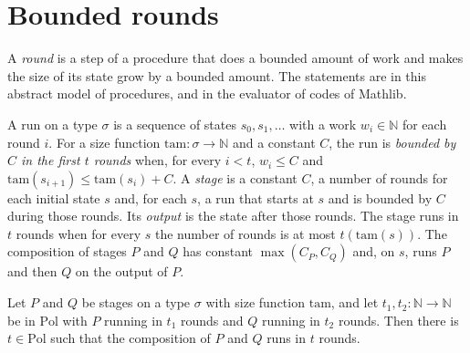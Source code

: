 \section{Bounded rounds}
\label{sec:machines-rounds}

A \emph{round} is a step of a procedure that does a bounded amount of work and makes the size of its state grow
by a bounded amount. The statements are in this abstract model of procedures, and in the evaluator of codes of
Mathlib.

\begin{definition}
  \label{def:machines-rounds}
  \leanok
  A run on a type $\sigma$ is a sequence of states $s_0, s_1, \dots$ with a work $w_i \in \mathbb{N}$ for each
  round $i$. For a size function $\mathrm{tam} : \sigma \to \mathbb{N}$ and a constant $C$, the run is
  \emph{bounded by $C$ in the first $t$ rounds} when, for every $i < t$, $w_i \le C$ and
  $\mathrm{tam}(s_{i+1}) \le \mathrm{tam}(s_i) + C$. A \emph{stage} is a constant $C$, a number of rounds for
  each initial state $s$ and, for each $s$, a run that starts at $s$ and is bounded by $C$ during those
  rounds. Its \emph{output} is the state after those rounds. The stage runs in $t$ rounds when for every $s$
  the number of rounds is at most $t(\mathrm{tam}(s))$. The composition of stages $P$ and $Q$ has constant
  $\max(C_P, C_Q)$ and, on $s$, runs $P$ and then $Q$ on the output of $P$.
  \own{}
  \infrastructure{}
\end{definition}

\begin{theorem}
  \label{thm:machines-rounds-comp}
  \leanok
  Let $P$ and $Q$ be stages on a type $\sigma$ with size function $\mathrm{tam}$, and let
  $t_1, t_2 : \mathbb{N} \to \mathbb{N}$ be in $\mathrm{Pol}$ with $P$ running in $t_1$ rounds and $Q$ running
  in $t_2$ rounds. Then there is $t \in \mathrm{Pol}$ such that the composition of $P$ and $Q$ runs in $t$
  rounds.
  \own{}
\end{theorem}

